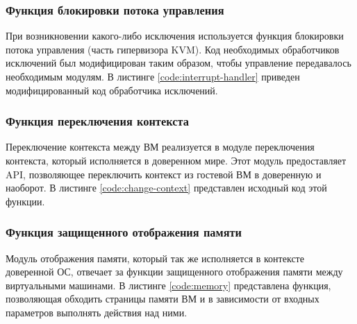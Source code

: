 \subsubsection{Функция блокировки потока управления}

При возникновении какого-либо исключения используется функция блокировки потока управления (часть гипервизора KVM). Код необходимых обработчиков исключений был модифицирован таким образом, чтобы управление передавалось необходимым модулям. В листинге  \ref{code:interrupt-handler} приведен модифицированный код обработчика исключений.


\subsubsection{Функция переключения контекста}

Переключение контекста между ВМ реализуется в модуле переключения контекста, который исполняется в доверенном мире. Этот модуль предоставляет API, позволяющее переключить контекст из гостевой ВМ в доверенную и наоборот. В листинге \ref{code:change-context} представлен исходный код этой функции.


\subsubsection{Функция защищенного отображения памяти}

Модуль отображения памяти, который так же исполняется в контексте доверенной ОС, отвечает за функции защищенного отображения памяти между виртуальными машинами. В листинге \ref{code:memory} представлена функция, позволяющая обходить страницы памяти ВМ и в зависимости от входных параметров выполнять действия над ними.


